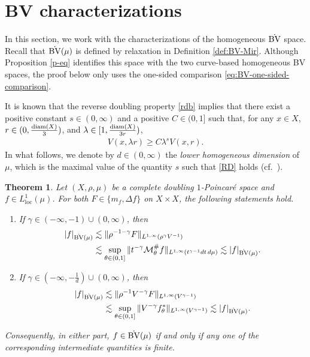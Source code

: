 \documentclass[11pt]{amsart}
\newtheorem{theorem}{Theorem}[section]
\theoremstyle{definition}
\theoremstyle{remark}
\numberwithin{equation}{section}
\newcommand{\Norm}[2]{\|#1\|_{#2}}
\begin{document}
\section{BV characterizations}\label{sec:BV}

In this section, we work with the characterizations of the homogeneous $\dot{\rm BV}$ space.
Recall that $\dot{\rm BV}(\mu)$ is defined by relaxation in Definition
\ref{def:BV-Mir}. Although Proposition \ref{p-eq} identifies this space
with the two curve-based homogeneous BV spaces, the proof below only uses
the one-sided comparison \eqref{eq:BV-one-sided-comparison}.

It is known that the reverse doubling property
\eqref{rdb} implies that there exist a
positive constant $s\in (0,\infty)$
and a positive $C\in(0,1]$ such that,
for any $x\in X$, $r\in(0,\frac{{\rm diam}( X)}{3})$,
and $\lambda\in[1,\frac{{\rm diam}( X)}{3r})$,
\begin{align}\label{RD}
V(x,\lambda r)\ge C\lambda^{s}V(x,r).
\end{align}
In what follows, we denote by $d\in(0,\infty)$ the \emph{lower homogeneous dimension} of
$\mu$,
which is the maximal value of the quantity $s$ such that \eqref{RD} holds
(cf.\ \cite[(1.14)]{DLYYZ}).

\begin{theorem}\label{thm:BV-characterizations}
Let $(X,\rho,\mu)$ be a complete doubling $1$-Poincar\'e space and
$f\in L^1_{\mathrm{loc}}(\mu)$.
For both $F\in\{m_f,\Delta f\}$ on $X\times X$,
the following statements hold.
\begin{enumerate}[\rm(i)]
\item If $\gamma\in(-\infty,-1)\cup(0,\infty)$, then
\begin{equation}\label{eq:cBV-rho}
\begin{split}
|f|_{\dot{\rm{BV}}(\mu)}
&\lesssim\Norm{\rho^{-1-\gamma}F}{L^{1,\infty}(\rho^\gamma V^{-1})}\\
&\lesssim\sup_{\theta\in(0,1]}
\Norm{t^{-\gamma}\mathcal M_\theta^{\#}f}
{L^{1,\infty}(t^{\gamma-1}dt\,d\mu)}
\lesssim|f|_{\dot{\rm{BV}}(\mu)}.
\end{split}
\end{equation}
\item If $\gamma\in(-\infty,-\frac1d)\cup(0,\infty)$, then
\begin{equation}\label{eq:cBV-volume}
\begin{split}
|f|_{\dot{\rm{BV}}(\mu)}
&\lesssim\Norm{\rho^{-1}V^{-\gamma}F}{L^{1,\infty}(V^{\gamma-1})}\\
&\lesssim\sup_{\theta\in(0,1]}
\Norm{V^{-\gamma}f^*_{\theta}}{L^{1,\infty}(V^{\gamma-1})}
\lesssim|f|_{\dot{\rm{BV}}(\mu)}.
\end{split}
\end{equation}
\end{enumerate}
Consequently, in either part, $f\in\dot{\rm{BV}}(\mu)$ if and only if
any one of the corresponding intermediate quantities is finite.
\end{theorem}
\end{document}
